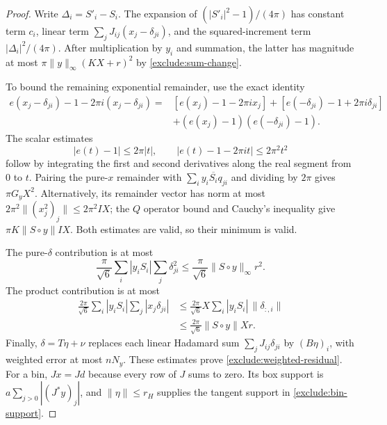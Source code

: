 \begin{proof}
Write $\Delta_i=S'_i-S_i$.  The expansion of
$(|S'_i|^2-1)/(4\pi)$ has constant term $c_i$, linear term
$\sum_jJ_{ij}(x_j-\delta_{ji})$, and the squared-increment term
$|\Delta_i|^2/(4\pi)$.
After multiplication by $y_i$ and summation, the latter has magnitude
at most $\pi\|y\|_\infty(KX+r)^2$ by
\eqref{exclude:sum-change}.

To bound the remaining exponential remainder, use the exact identity
\begin{align*}
 e(x_j-\delta_{ji})-1-2\pi i(x_j-\delta_{ji})
 ={}&[e(x_j)-1-2\pi i x_j]
      +[e(-\delta_{ji})-1+2\pi i\delta_{ji}]\\
    &+(e(x_j)-1)(e(-\delta_{ji})-1).
\end{align*}
The scalar estimates
\[
 |e(t)-1|\le2\pi|t|,\qquad
 |e(t)-1-2\pi it|\le2\pi^2t^2
\]
follow by integrating the first and second derivatives along the real
segment from $0$ to $t$.
Pairing the pure-$x$ remainder with
$\sum_i y_i\overline{S_i}q_{ji}$ and dividing by $2\pi$ gives
$\pi G_yX^2$.
Alternatively, its remainder vector has norm at most
$2\pi^2\|(x_j^2)_j\|\le2\pi^2IX$; the $Q$ operator bound and Cauchy's
inequality give $\pi K\|S\circ y\|IX$.
Both estimates are valid, so their minimum is valid.

The pure-$\delta$ contribution is at most
\[
 \frac{\pi}{\sqrt6}\sum_i |y_iS_i|\sum_j\delta_{ji}^2
 \le\frac{\pi}{\sqrt6}\|S\circ y\|_\infty r^2.
\]
The product contribution is at most
\begin{align*}
 \frac{2\pi}{\sqrt6}\sum_i|y_iS_i|
       \sum_j|x_j\delta_{ji}|
 &\le\frac{2\pi}{\sqrt6}X
       \sum_i|y_iS_i|\,\|\delta_{:,i}\|\\
 &\le\frac{2\pi}{\sqrt6}\|S\circ y\|Xr.
\end{align*}
Finally, $\delta=T\eta+\nu$ replaces each linear Hadamard sum
$\sum_jJ_{ij}\delta_{ji}$ by $(B\eta)_i$, with weighted error at most
$nN_y$.
These estimates prove \eqref{exclude:weighted-residual}.
For a bin, $Jx=Jd$ because every row of $J$ sums to zero.  Its box
support is $a\sum_{j>0}|(J^*y)_j|$, and
$\|\eta\|\le r_H$ supplies the tangent support in
\eqref{exclude:bin-support}.
\end{proof}

